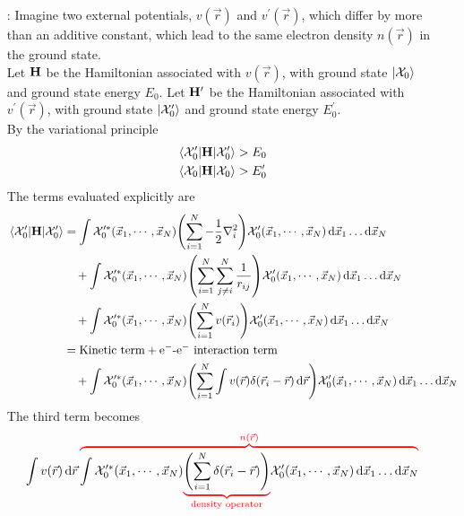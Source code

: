 \documentclass[12pt,a4paper,titlepage]{article}
\newcommand\hruleMod{%
	\vskip12pt
	\nointerlineskip
	{\color{lightgray}\leaders\vrule width \textwidth\vskip0.4pt}
	\nointerlineskip
	\vskip12pt
}
\newcommand{\aside}[3][]{ %
	\ifthenelse{\equal{#1}{}}{\hruleMod}{}
	\begin{itemize}[align=left,labelindent=0em,labelwidth=3em,labelsep*=0.5em,leftmargin=!]
		\item[\ul{#2}:]{#3}
	\end{itemize}
	\ifthenelse{\equal{#1}{}}{\hruleMod}{}
}
\newcommand{\trm}[1]{\textrm{#1}} %
\newcommand{\ul}[1]{\underline{\smash{#1}}} %
\newcommand{\Chi}{\mathcal{X}} %
\begin{document}
\aside{Proof}{Imagine two external potentials, $v(\vec{r})$ and $v^{\prime}(\vec{r})$, which differ by more than an additive constant, which lead to the same electron density $n(\vec{r})$ in the ground state.\\

Let $\vb{H}$ be the Hamiltonian associated with $v(\vec{r})$, with ground state $\ket{\Chi_{0}}$ and ground state energy $E_{0}$. Let $\vb{H}^{\prime}$ be the Hamiltonian associated with $v^{\prime}(\vec{r})$, with ground state $\ket{\Chi_{0}^{\prime}}$ and ground state energy $E_{0}^{\prime}$.\\

By the variational principle
\begin{equation}
\begin{aligned}
\mel{\Chi_{0}^{\prime}}{\vb{H}}{\Chi_{0}^{\prime}}&>E_{0}\\
\mel{\Chi_{0}}{\vb{H}}{\Chi_{0}}&>E_{0}^{\prime}
\end{aligned}
\end{equation}
The terms evaluated explicitly are
\begin{equation}
\begin{aligned}
\mel{\Chi_{0}^{\prime}}{\vb{H}}{\Chi_{0}^{\prime}}&=\int\Chi_{0}^{\prime *}(\vec{x}_{1},\cdots,\vec{x}_{N})\qty(\sum_{i=1}^{N}-\frac{1}{2}\nabla_{i}^{2})\Chi_{0}^{\prime}(\vec{x}_{1},\cdots,\vec{x}_{N})\dd{\vec{x}_{1}}\ldots\dd{\vec{x}_{N}}\\
&\quad+\int\Chi_{0}^{\prime *}(\vec{x}_{1},\cdots,\vec{x}_{N})\qty(\sum_{i=1}^{N}\sum_{j\neq i}^{N}\frac{1}{r_{ij}})\Chi_{0}^{\prime}(\vec{x}_{1},\cdots,\vec{x}_{N})\dd{\vec{x}_{1}}\ldots\dd{\vec{x}_{N}}\\
&\quad+\int\Chi_{0}^{\prime *}(\vec{x}_{1},\cdots,\vec{x}_{N})\qty(\sum_{i=1}^{N}v(\vec{r}_{i}))\Chi_{0}^{\prime}(\vec{x}_{1},\cdots,\vec{x}_{N})\dd{\vec{x}_{1}}\ldots\dd{\vec{x}_{N}}\\
&=\trm{Kinetic term} + \trm{e$^{-}$-e$^{-}$ interaction term}\\
&\quad+\int\Chi_{0}^{\prime *}(\vec{x}_{1},\cdots,\vec{x}_{N})\qty(\sum_{i=1}^{N}\int v(\vec{r})\delta(\vec{r}_{i}-\vec{r})\dd{\vec{r}})\Chi_{0}^{\prime}(\vec{x}_{1},\cdots,\vec{x}_{N})\dd{\vec{x}_{1}}\ldots\dd{\vec{x}_{N}}
\end{aligned}
\end{equation}
The third term becomes
\begin{equation}
\int v(\vec{r})\dd{\vec{r}}{\color{red}\overbrace{\color{black}\int\Chi_{0}^{\prime *}(\vec{x}_{1},\cdots,\vec{x}_{N}){\color{red}\underbrace{\color{black}\qty(\sum_{i=1}^{N}\delta(\vec{r}_{i}-\vec{r}))}_{\mathclap{\trm{density operator}}}}\Chi_{0}^{\prime}(\vec{x}_{1},\cdots,\vec{x}_{N})\dd{\vec{x}_{1}}\ldots\dd{\vec{x}_{N}}}^{n(\vec{r})}}

\end{equation}}
\end{document}
